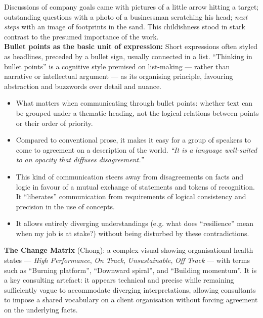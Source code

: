 \documentclass[a4paper,12pt]{article}
\begin{document}
\noindent Discussions of company goals came with pictures of a little arrow hitting a target; outstanding questions with a photo of a businessman scratching his head; \emph{next steps} with an image of footprints in the sand. This childishness stood in stark contrast to the presumed importance of the work. \\

\noindent \textbf{Bullet points as the basic unit of expression:} Short expressions often styled as headlines, preceded by a bullet sign, usually connected in a list. ``Thinking in bullet points'' is a cognitive style premised on list-making — rather than narrative or intellectual argument — as its organising principle, favouring abstraction and buzzwords over detail and nuance.

\begin{itemize}
	\item What matters when communicating through bullet points: whether text can be grouped under a thematic heading, not the logical relations between points or their order of priority.
	\item Compared to conventional prose, it makes it easy for a group of speakers to come to agreement on a description of the world. \emph{``It is a language well-suited to an opacity that diffuses disagreement.''}
	\item This kind of communication steers away from disagreements on facts and logic in favour of a mutual exchange of statements and tokens of recognition. It ``liberates'' communication from requirements of logical consistency and precision in the use of concepts.
	\item It allows entirely diverging understandings (e.g. what does ``resilience'' mean when my job is at stake?) without being disturbed by these contradictions.
\end{itemize}

\noindent \textbf{The Change Matrix} (Chong): a complex visual showing organisational health states — \emph{High Performance}, \emph{On Track}, \emph{Unsustainable}, \emph{Off Track} — with terms such as ``Burning platform'', ``Downward spiral'', and ``Building momentum''. It is a key consulting artefact: it appears technical and precise while remaining sufficiently vague to accommodate diverging interpretations, allowing consultants to impose a shared vocabulary on a client organisation without forcing agreement on the underlying facts.
\end{document}
